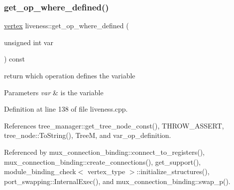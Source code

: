 \subsubsection{\texorpdfstring{get\+\_\+op\+\_\+where\+\_\+defined()}{get\_op\_where\_defined()}}
{\footnotesize\ttfamily \hyperlink{graph_8hpp_abefdcf0544e601805af44eca032cca14}{vertex} liveness\+::get\+\_\+op\+\_\+where\+\_\+defined (\begin{DoxyParamCaption}\item[{unsigned int}]{var }\end{DoxyParamCaption}) const}



return which operation defines the variable 


\begin{DoxyParams}{Parameters}
{\em var} & is the variable \\
\hline
\end{DoxyParams}


Definition at line 138 of file liveness.\+cpp.



References tree\+\_\+manager\+::get\+\_\+tree\+\_\+node\+\_\+const(), T\+H\+R\+O\+W\+\_\+\+A\+S\+S\+E\+RT, tree\+\_\+node\+::\+To\+String(), TreeM, and var\+\_\+op\+\_\+definition.



Referenced by mux\+\_\+connection\+\_\+binding\+::connect\+\_\+to\+\_\+registers(), mux\+\_\+connection\+\_\+binding\+::create\+\_\+connections(), get\+\_\+support(), module\+\_\+binding\+\_\+check$<$ vertex\+\_\+type $>$\+::initialize\+\_\+structures(), port\+\_\+swapping\+::\+Internal\+Exec(), and mux\+\_\+connection\+\_\+binding\+::swap\+\_\+p().


